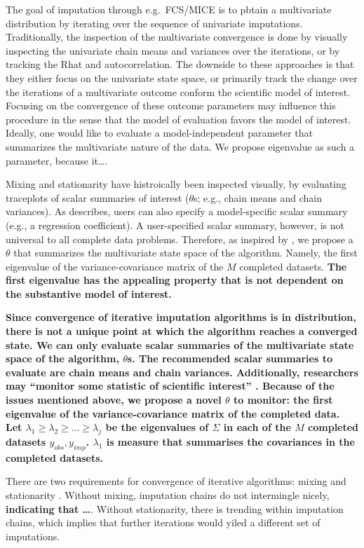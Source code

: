 \documentclass[Royal,times,sageh]{sagej}
\begin{document}
The goal of imputation through e.g.~FCS/MICE is to pbtain a multivariate
distribution by iterating over the sequence of univariate imputations.
Traditionally, the inspection of the multivariate convergence is done by
visually inspecting the univariate chain means and variances over the
iterations, or by tracking the Rhat and autocorrelation. The downside to
these approaches is that they either focus on the univariate state
space, or primarily track the change over the iterations of a
multivariate outcome conform the scientific model of interest. Focusing
on the convergence of these outcome parameters may influence this
procedure in the sense that the model of evaluation favors the model of
interest. Ideally, one would like to evaluate a model-independent
parameter that summarizes the multivariate nature of the data. We
propose eigenvalue as such a parameter, because it\ldots.

Mixing and stationarity have histroically been inspected visually, by
evaluating traceplots of scalar summaries of interest (\(\theta\)s;
e.g., chain means and chain variances). As \citet{buur18} describes,
users can also specify a model-specific scalar summary (e.g., a
regression coefficient). A user-specified scalar summary, however, is
not universal to all complete data problems. Therefore, as inspired by
\citep{mack03}, we propose a \(\theta\) that summarizes the multivariate
state space of the algorithm. Namely, the first eigenvalue of the
variance-covariance matrix of the \(M\) completed datasets. \textbf{The
first eigenvalue has the appealing property that is not dependent on the
substantive model of interest.}

\textbf{Since convergence of iterative imputation algorithms is in
distribution, there is not a unique point at which the algorithm reaches
a converged state. We can only evaluate scalar summaries of the
multivariate state space of the algorithm, \(\theta\)s. The recommended
scalar summaries to evaluate are chain means and chain variances.
Additionally, researchers may ``monitor some statistic of scientific
interest'' \citep[\(\S\) 6.5.2]{buur18}. Because of the issues mentioned
above, we propose a novel \(\theta\) to monitor: the first eigenvalue of
the variance-covariance matrix of the completed data. Let
\(\lambda_1 \geq \lambda_2 \geq ... \geq \lambda_j\) be the eigenvalues
of \(\Sigma\) in each of the \(M\) completed datasets
\({y_{obs}, y_{imp}}\). \(\lambda_1\) is measure that summarises the
covariances in the completed datasets.}

There are two requirements for convergence of iterative algorithms:
mixing and stationarity \citep{gelm13}. Without mixing, imputation
chains do not intermingle nicely, \textbf{indicating that \ldots{}}.
Without stationarity, there is trending within imputation chains, which
implies that further iterations would yiled a different set of
imputations.
\end{document}
